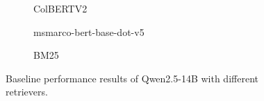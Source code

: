 \begin{figure}
\centering

\begin{subfigure}[b]{1.0\textwidth}
    
    \vspace{-1.0em}
    \caption{\scriptsize ColBERTV2}\label{fig:scores_colbert_qwen}
\end{subfigure}

\vspace{1.0em}

\begin{subfigure}[b]{0.49\textwidth}
    
    \caption{\scriptsize msmarco-bert-base-dot-v5}\label{fig:scores_dense_qwen}
\end{subfigure}
\begin{subfigure}[b]{0.49\textwidth}
    
    \caption{\scriptsize BM25}\label{fig:scores_bm25_qwen}
\end{subfigure}

\caption{Baseline performance results of Qwen2.5-14B with different retrievers.}
\label{fig:scores_qwen}
\end{figure}